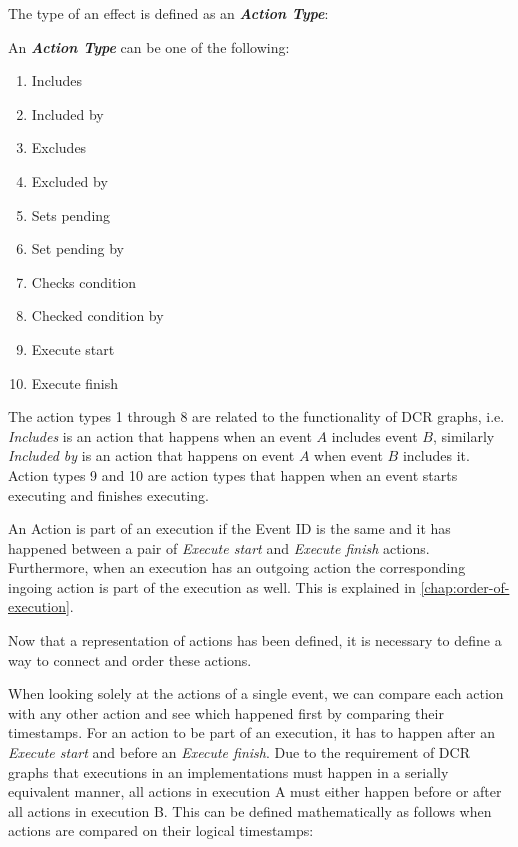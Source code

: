 	\newpar	The type of an effect is defined as an \textit{\textbf{Action Type}}:
	
	\begin{definition}
        \label{def:actiontype}
		An \textit{\textbf{Action Type}} can be one of the following:
		\begin{multicols}{3}
			\begin{enumerate}
				\item Includes
				\item Included by
				\item Excludes
				\item Excluded by
				\item Sets pending
				\item Set pending by
				\item Checks condition
				\item Checked condition by
				\item Execute start
				\item Execute finish
			\end{enumerate}
		\end{multicols}
	\end{definition}
	
	\newpar The action types 1 through 8 are related to the functionality of DCR graphs, i.e. \textit{Includes} is an action that happens when an event $A$ includes event $B$, similarly \textit{Included by} is an action that happens on event $A$ when event $B$ includes it. Action types 9 and 10 are action types that happen when an event starts executing and finishes executing. 
    
    \newpar
    An Action is part of an execution if the Event ID is the same and it has happened between a pair of \textit{Execute start} and \textit{Execute finish} actions. Furthermore, when an execution has an outgoing action the corresponding ingoing action is part of the execution as well. This is explained in \autoref{chap:order-of-execution}.
	
	\newpar Now that a representation of actions has been defined, it is necessary to define a way to connect and order these actions.
    
    \newpar When looking solely at the actions of a single event, we can compare each action with any other action and see which happened first by comparing their timestamps. For an action to be part of an execution, it has to happen after an \textit{Execute start} and before an \textit{Execute finish}. Due to the requirement of DCR graphs that executions in an implementations must happen in a serially equivalent manner, all actions in execution A must either happen before or after all actions in execution B. This can be defined mathematically as follows when actions are compared on their logical timestamps:
	
